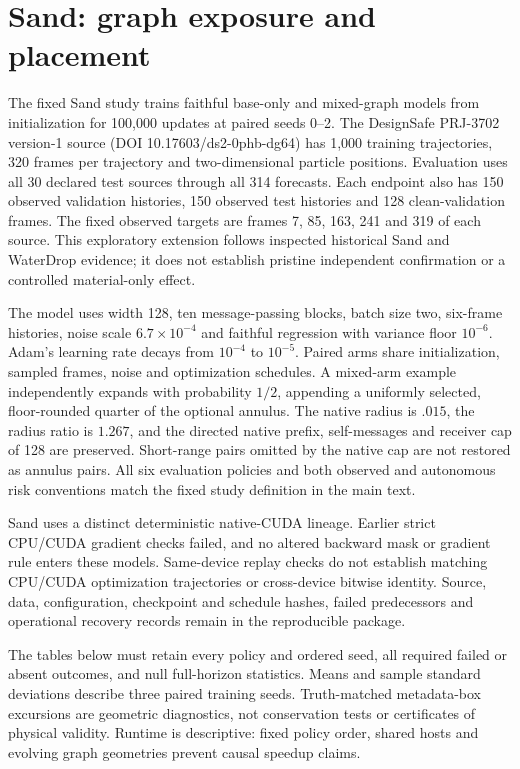 \section{Sand: graph exposure and placement}
\label{sec:sand-graph-exposure}
The fixed Sand study trains faithful base-only and mixed-graph models from initialization for 100,000 updates at paired seeds 0--2. The DesignSafe PRJ-3702 version-1 source (DOI 10.17603/ds2-0phb-dg64) has 1,000 training trajectories, 320 frames per trajectory and two-dimensional particle positions. Evaluation uses all 30 declared test sources through all 314 forecasts. Each endpoint also has 150 observed validation histories, 150 observed test histories and 128 clean-validation frames. The fixed observed targets are frames 7, 85, 163, 241 and 319 of each source. This exploratory extension follows inspected historical Sand and WaterDrop evidence; it does not establish pristine independent confirmation or a controlled material-only effect.

The model uses width 128, ten message-passing blocks, batch size two, six-frame histories, noise scale $6.7\times10^{-4}$ and faithful regression with variance floor $10^{-6}$. Adam's learning rate decays from $10^{-4}$ to $10^{-5}$. Paired arms share initialization, sampled frames, noise and optimization schedules. A mixed-arm example independently expands with probability $1/2$, appending a uniformly selected, floor-rounded quarter of the optional annulus. The native radius is $.015$, the radius ratio is $1.267$, and the directed native prefix, self-messages and receiver cap of 128 are preserved. Short-range pairs omitted by the native cap are not restored as annulus pairs. All six evaluation policies and both observed and autonomous risk conventions match the fixed study definition in the main text.

Sand uses a distinct deterministic native-CUDA lineage. Earlier strict CPU/CUDA gradient checks failed, and no altered backward mask or gradient rule enters these models. Same-device replay checks do not establish matching CPU/CUDA optimization trajectories or cross-device bitwise identity. Source, data, configuration, checkpoint and schedule hashes, failed predecessors and operational recovery records remain in the reproducible package.

The tables below must retain every policy and ordered seed, all required failed or absent outcomes, and null full-horizon statistics. Means and sample standard deviations describe three paired training seeds. Truth-matched metadata-box excursions are geometric diagnostics, not conservation tests or certificates of physical validity. Runtime is descriptive: fixed policy order, shared hosts and evolving graph geometries prevent causal speedup claims.

